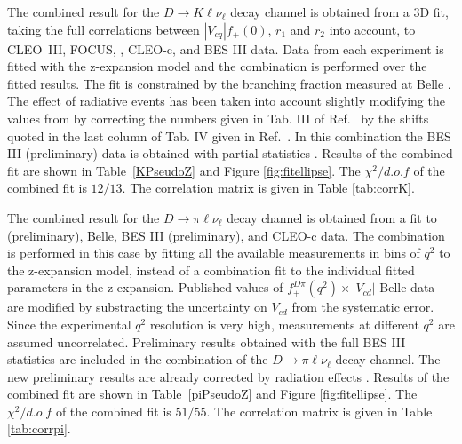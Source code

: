 The combined result for the $D\to K \ell\nu_{\ell}$ decay channel is obtained from a 3D fit, 
taking the full correlations between $|V_{cq}|f_+(0)$, $r_1$ and $r_2$ into account, 
to CLEO~III, FOCUS, \babar, CLEO-c, and BES III data. Data from each experiment is fitted with the 
z-expansion model and the combination is performed over the fitted results.   
The fit is constrained by the branching fraction measured at Belle \cite{Widhalm:2006wz}.
The effect of radiative events has been taken into account slightly modifying the values from \babar by 
correcting the numbers given in Tab. III of Ref.~\cite{Aubert:2007wg} by the shifts quoted in the last 
column of Tab. IV given in Ref.~\cite{Aubert:2007wg}. In this combination the BES III (preliminary) 
data is obtained with partial statistics \cite{BESIII}.
Results of the combined fit are shown in Table~\ref{KPseudoZ} and Figure \ref{fig:fitellipse}.
The $\chi^2/d.o.f$ of the combined fit is $12/13$. 
The correlation matrix is given in Table \ref{tab:corrK}.

The combined result for the $D\to \pi \ell\nu_{\ell}$ decay channel is obtained from a fit 
to \babar (preliminary), Belle, BES III (preliminary), and CLEO-c data. The combination is performed in this case 
by fitting all the available measurements in bins of $q^2$ to the z-expansion model, instead of a combination fit to the 
individual fitted parameters in the z-expansion. 
Published values of $f^{D\pi}_{+} (q^2) \times |V_{cd}|$ Belle data \cite{Widhalm:2006wz} are modified by substracting the uncertainty on $V_{cd}$ 
from the systematic error. Since the experimental $q^2$ resolution is very high, measurements at different $q^2$ are assumed uncorrelated. 
Preliminary results obtained with the full BES III statistics \cite{BESIII-new} are included 
in the combination of the $D\to \pi \ell\nu_{\ell}$ decay channel.
The new preliminary \babar results are already corrected by radiation effects \cite{babar-new}.
Results of the combined fit are shown in Table~\ref{piPseudoZ} and Figure \ref{fig:fitellipse}.
The $\chi^2/d.o.f$ of the combined fit is $51/55$. 
The correlation matrix is given in Table \ref{tab:corrpi}.

